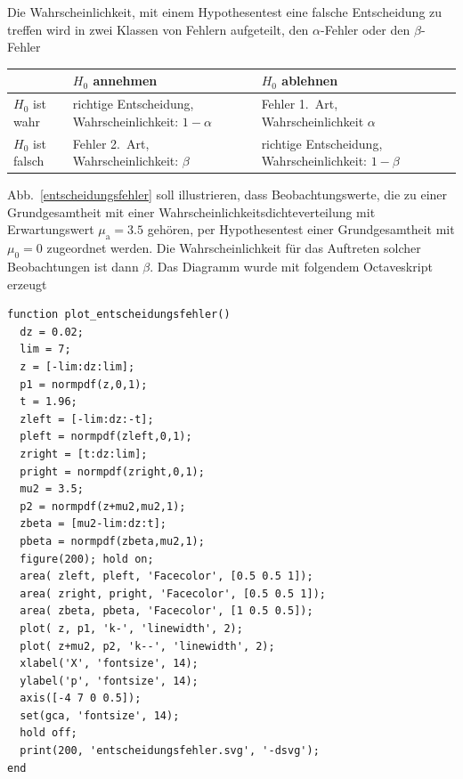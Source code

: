 Die Wahrscheinlichkeit, mit einem Hypothesentest eine falsche
Entscheidung zu treffen wird in zwei Klassen von Fehlern aufgeteilt, den
$\alpha$-Fehler oder den $\beta$-Fehler

\begin{center}
\begin{tabular}{M{3cm}|M{5.5cm}|M{5.5cm} N}
                 &     $H_0$ annehmen    &     $H_0$ ablehnen   \\[3pt]
\hline
$H_0$ ist wahr   & richtige Entscheidung, Wahrscheinlichkeit: $1-\alpha$ & Fehler 1.\ Art, Wahrscheinlichkeit $\alpha$ \\[3pt]
\hline
$H_0$ ist falsch & Fehler 2.\ Art, Wahrscheinlichkeit: $\beta$  & richtige Entscheidung, Wahrscheinlichkeit: $1-\beta$
\end{tabular}
\end{center}

Abb.~\ref{entscheidungsfehler} soll illustrieren, dass Beobachtungswerte, die zu einer
Grundgesamtheit mit einer Wahrscheinlichkeitsdichteverteilung mit Erwartungswert
$\mu_\mathrm{a} = 3.5$ gehören, per Hypothesentest einer Grundgesamtheit mit $\mu_0 = 0$
zugeordnet werden. Die Wahrscheinlichkeit für das Auftreten solcher Beobachtungen ist
dann $\beta$. Das Diagramm wurde mit folgendem Octaveskript erzeugt

\begin{lstlisting}
function plot_entscheidungsfehler()
  dz = 0.02;
  lim = 7;
  z = [-lim:dz:lim];
  p1 = normpdf(z,0,1);
  t = 1.96;
  zleft = [-lim:dz:-t];
  pleft = normpdf(zleft,0,1);
  zright = [t:dz:lim];
  pright = normpdf(zright,0,1);
  mu2 = 3.5;
  p2 = normpdf(z+mu2,mu2,1);
  zbeta = [mu2-lim:dz:t];
  pbeta = normpdf(zbeta,mu2,1);
  figure(200); hold on;
  area( zleft, pleft, 'Facecolor', [0.5 0.5 1]);
  area( zright, pright, 'Facecolor', [0.5 0.5 1]);
  area( zbeta, pbeta, 'Facecolor', [1 0.5 0.5]);
  plot( z, p1, 'k-', 'linewidth', 2);
  plot( z+mu2, p2, 'k--', 'linewidth', 2);
  xlabel('X', 'fontsize', 14);
  ylabel('p', 'fontsize', 14);
  axis([-4 7 0 0.5]);
  set(gca, 'fontsize', 14);
  hold off;
  print(200, 'entscheidungsfehler.svg', '-dsvg');
end
\end{lstlisting}

